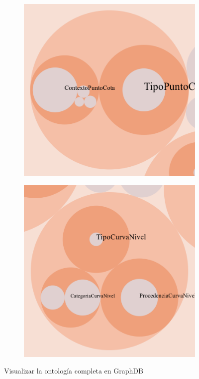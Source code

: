 \begin{figure}[H]
\begin{subfigure}[h]{0.33\textwidth}
		\caption{}
	\end{subfigure}
\begin{subfigure}[h]{0.33\textwidth} 
	\includegraphics[width=\textwidth]{imagenes/capitulo5/class-hierarchy-TFM-3}
	\caption{}
\end{subfigure}
\begin{subfigure}[h]{0.33\textwidth} 
	\includegraphics[width=\textwidth]{imagenes/capitulo5/class-hierarchy-TFM-4}
	\caption{}
\end{subfigure}
	\caption{Visualizar la ontología completa en GraphDB}
	\label{fig:class}
\end{figure}


